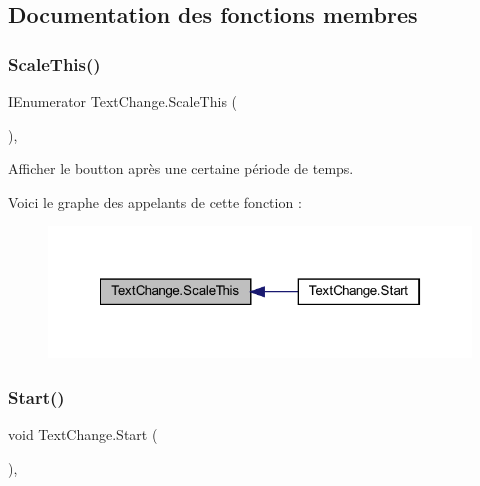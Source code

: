 \subsection{Documentation des fonctions membres}
\mbox{\label{class_text_change_a4fa76be59683626a930fc35f76a9c203}} 
\subsubsection{\texorpdfstring{Scale\+This()}{ScaleThis()}}
{\footnotesize\ttfamily I\+Enumerator Text\+Change.\+Scale\+This (\begin{DoxyParamCaption}{ }\end{DoxyParamCaption})\hspace{0.3cm}{\ttfamily [inline]}, {\ttfamily [private]}}



Afficher le boutton après une certaine période de temps. 

Voici le graphe des appelants de cette fonction \+:
\nopagebreak
\begin{figure}[H]
\begin{center}
\leavevmode
\includegraphics[width=322pt]{class_text_change_a4fa76be59683626a930fc35f76a9c203_icgraph}
\end{center}
\end{figure}
\mbox{\label{class_text_change_a2c9022c92c5bc0756fe5c8196b309b38}} 
\subsubsection{\texorpdfstring{Start()}{Start()}}
{\footnotesize\ttfamily void Text\+Change.\+Start (\begin{DoxyParamCaption}{ }\end{DoxyParamCaption})\hspace{0.3cm}{\ttfamily [inline]}, {\ttfamily [private]}}



